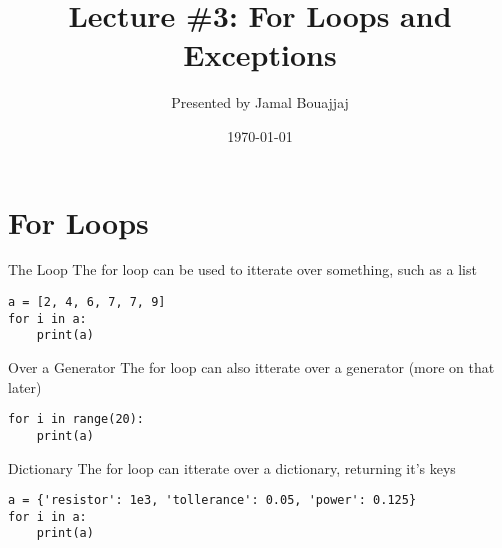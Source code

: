 %
%



\title{Lecture \#3: For Loops and Exceptions}
\date{\today}
\author{Presented by Jamal Bouajjaj}



\maketitle

\section{For Loops}
\begin{frame}[containsverbatim]{The Loop}
    The for loop can be used to itterate over something, such as a list
    \begin{verbatim}
a = [2, 4, 6, 7, 7, 9]
for i in a:
    print(a)
    \end{verbatim}
\end{frame}

\begin{frame}[containsverbatim]{Over a Generator}
    The for loop can also itterate over a generator (more on that later)
    \begin{verbatim}
for i in range(20):
    print(a)
    \end{verbatim}
\end{frame}

\begin{frame}[containsverbatim]{Dictionary}
    The for loop can itterate over a dictionary, returning it's keys
    \begin{verbatim}
a = {'resistor': 1e3, 'tollerance': 0.05, 'power': 0.125}
for i in a:
    print(a)
    \end{verbatim}
\end{frame}

